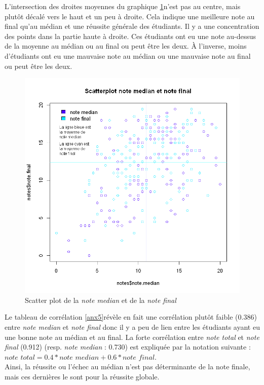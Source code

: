 \documentclass{article}
\begin{document}
L'intersection des droites moyennes du graphique \lbrack\ref{anx4}\rbrack n'est pas au centre, mais plutôt décalé vers le haut et un peu à droite. Cela indique une meilleure note au final qu'au médian et une réussite générale des étudiants. Il y a une concentration des points dans la partie haute à droite. Ces étudiants ont eu une note au-dessus de la moyenne au médian ou au final ou peut être les deux. À l'inverse, moins d'étudiants ont eu une mauvaise note au médian ou une mauvaise note au final ou peut être les deux.
\begin{figure}[H] %
\begin{center}
\includegraphics[scale=0.40]{./img/scatterplot_median_final_avg-bar.png}
\caption{Scatter plot de la \textit{note median} et de la \textit{note final}}
\label{anx4}
\end{center}
\end{figure}
Le tableau de corrélation \lbrack\ref{anx5}\rbrack révèle en fait une corrélation plutôt faible (0.386) entre \textit{note median} et \textit{note final} donc il y a peu de lien entre les étudiants ayant eu une bonne note au médian et au final. La forte corrélation entre \textit{note total} et \textit{note final} (0.912) (resp. \textit{note median} : 0.730) est expliquée par la notation suivante : $\textit{note total} = 0.4*\textit{note median}+0.6*\textit{note final}$.\\
Ainsi, la réussite ou l'échec au médian n'est pas déterminante de la note finale, mais ces dernières le sont pour la réussite globale.
\end{document}
